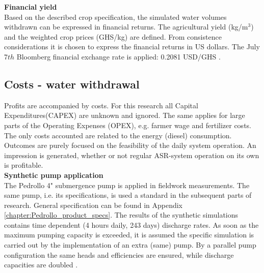 %
%
%
%

\textbf{Financial yield} \\
Based on the described crop specification, the simulated water volumes withdrawn can be expressed in financial returns. The agricultural yield (kg/m$^3$) and the weighted crop prices (GHS/kg) are defined. From consistence considerations it is chosen to express the financial returns in US dollars. The July 7$th$ Bloomberg financial exchange rate is applied: 0.2081 USD/GHS \citep{Bloomberg2018}.

\subsection{Costs - water withdrawal}
Profits are accompanied by costs. For this research all Capital Expenditures(CAPEX) are unknown and ignored. The same applies for large parts of the Operating Expenses (OPEX), e.g. farmer wage and fertilizer costs. The only costs accounted are related to the energy (diesel) consumption. Outcomes are purely focused on the feasibility of the daily system operation. An impression is generated, whether or not regular ASR-system operation on its own is profitable. \\

\textbf{Synthetic pump application} \\
The Pedrollo 4" submergence pump is applied in fieldwork measurements. The same pump, i.e. its specifications, is used a standard in the subsequent parts of research. General specification can be found in Appendix \ref{chapter:Pedrollo_product_specs}. The results of the synthetic simulations contains time dependent (4 hours daily, 243 days) discharge rates. As soon as the maximum pumping capacity is exceeded, it is assumed the specific simulation is carried out by the implementation of an extra (same) pump. By a parallel pump configuration the same heads and efficiencies are ensured, while discharge capacities are doubled \citep{VandeGiesen2013}. \\ 

